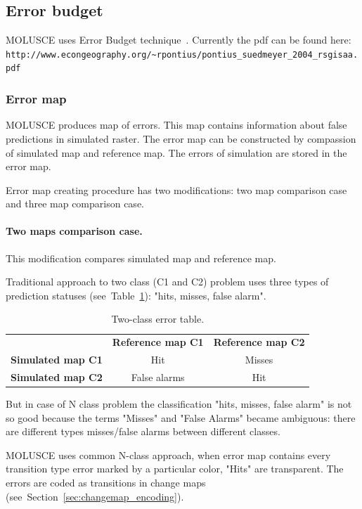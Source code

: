 \documentclass{report}
\begin{document}
\subsection{Error budget}
MOLUSCE uses Error Budget technique~\cite[Chapter~17]{pontius2004maps_aggreament}.
Currently the pdf can be found here: \verb+http://www.econgeography.org/~rpontius/pontius_suedmeyer_2004_rsgisaa.pdf+

\subsubsection{Error map}

MOLUSCE produces map of errors. This map contains information about false predictions in simulated raster. The error map can be constructed by compassion of simulated map and reference map. The errors of simulation are stored in the error map.

Error map creating procedure has two modifications: two map comparison case and three map comparison case. 

\paragraph{Two maps comparison case.}
This modification compares simulated map and reference map.

Traditional approach to two class (C1 and C2) problem uses three types of prediction statuses (see~Table~\ref{tab:2classET}): "hits, misses, false alarm".

\begin{table}
\centering
\caption{Two-class error table.}
\begin{tabular}{lcc}
   & \bf{Reference map C1} & \bf{Reference map C2}   \\
 \bf{Simulated map C1} & Hit & Misses \\
 \bf{Simulated map C2} & False alarms & Hit 
\end{tabular}
\label{tab:2classET}
\end{table}

But in case of N class problem the classification "hits, misses, false alarm" is not so good because the terms "Misses" and "False Alarms" became ambiguous: there are different types misses/false alarms between different classes.

MOLUSCE uses common N-class approach, when error map contains every transition type error marked by a particular color, "Hits" are transparent. The errors are coded as transitions in change maps (see~Section~\ref{sec:changemap_encoding}).
\end{document}
